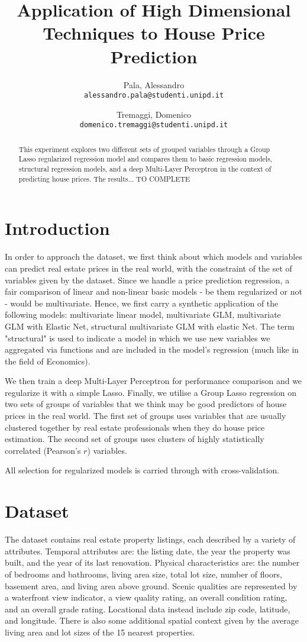 \documentclass[a4paper, 8pt]{article}
\title{Application of High Dimensional Techniques to House Price Prediction}
\author{
  Pala, Alessandro\\
  \texttt{alessandro.pala@studenti.unipd.it}
  \and
  Tremaggi, Domenico\\
  \texttt{domenico.tremaggi@studenti.unipd.it}
}
\date{}
\begin{document}
\maketitle
\noindent
\begin{abstract}
This experiment explores two different sets of grouped variables through a Group Lasso regularized regression model and compares them to basic regression models, structural regression models, and a deep Multi-Layer Perceptron in the context of predicting house prices. The results... TO COMPLETE
\end{abstract}
\vspace{5pt}

\begin{multicols}{2}

\section{Introduction}
In order to approach the dataset, we first think about which models and variables can predict real estate prices in the real world, with the constraint of the set of variables given by the dataset. Since we handle a price prediction regression, a fair comparison of linear and non-linear basic models - be them regularized or not - would be multivariate. Hence, we first carry a synthetic application of the following models: multivariate linear model, multivariate GLM, multivariate GLM with Elastic Net, structural multivariate GLM with elastic Net. The term "structural" is used to indicate a model in which we use new variables we aggregated via functions and are included in the model's regression (much like in the field of Economics).

We then train a deep Multi-Layer Perceptron for performance comparison and we regularize it with a simple Lasso.
Finally, we utilise a Group Lasso regression on two sets of groups of variables that we think may be good predictors of house prices in the real world. The first set of groups uses variables that are usually clustered together by real estate professionals when they do house price estimation. The second set of groups uses clusters of highly statistically correlated (Pearson's $r$) variables.

All selection for regularized models is carried through with cross-validation.

\section{Dataset}
The dataset contains real estate property listings, each described by a variety of attributes. Temporal attributes are: the listing date, the year the property was built, and the year of its last renovation. Physical characteristics are: the number of bedrooms and bathrooms, living area size, total lot size, number of floors, basement area, and living area above ground. Scenic qualities are represented by a waterfront view indicator, a view quality rating, an overall condition rating, and an overall grade rating. Locational data instead include zip code,  latitude, and longitude. There is also some additional spatial context given by the average living area and lot sizes of the 15 nearest properties.


\end{multicols}
\end{document}
